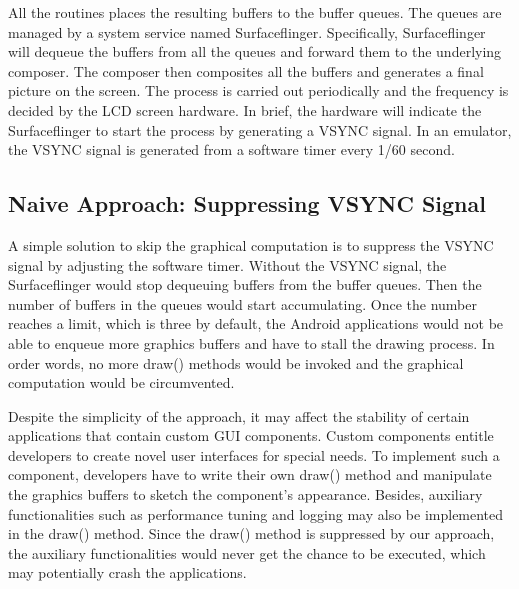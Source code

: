 \documentclass[conference]{IEEEtranl}
\begin{document}
	All the routines places the resulting buffers to the buffer queues. The queues are managed by a system service named Surfaceflinger. Specifically, Surfaceflinger will dequeue the buffers from all the queues and forward them to the underlying composer. The composer then composites all the buffers and generates a final picture on the screen. The process is carried out periodically and the frequency is decided by the LCD screen hardware. In brief, the hardware will indicate the Surfaceflinger to start the process by generating a VSYNC signal. In an emulator, the VSYNC signal is generated from a software timer every 1/60 second. 

	\subsection{Naive Approach: Suppressing VSYNC Signal}
	A simple solution to skip the graphical computation is to suppress the VSYNC signal by adjusting the software timer. Without the VSYNC signal, the Surfaceflinger would stop dequeuing buffers from the buffer queues. Then the number of buffers in the queues would start accumulating. Once the number reaches a limit, which is three by default, the Android applications would not be able to enqueue more graphics buffers and have to stall the drawing process. In order words, no more draw() methods would be invoked and the graphical computation would be circumvented.

	Despite the simplicity of the approach, it may affect the stability of certain applications that contain custom GUI components. Custom components entitle developers to create novel user interfaces for special needs. To implement such a component, developers have to write their own draw() method and manipulate the graphics buffers to sketch the component's appearance. Besides, auxiliary functionalities such as performance tuning and logging may also be implemented in the draw() method. Since the draw() method is suppressed by our approach, the auxiliary functionalities would never get the chance to be executed, which may potentially crash the applications.




\end{document}
